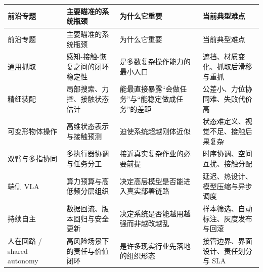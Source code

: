 \begingroup
\small
\begin{xltabular}{\textwidth}{YYYY}
\toprule
前沿专题 & 主要瞄准的系统瓶颈 & 为什么它重要 & 当前典型难点 \\
\midrule
\endfirsthead
\toprule
前沿专题 & 主要瞄准的系统瓶颈 & 为什么它重要 & 当前典型难点 \\
\midrule
\endhead
通用抓取 & 感知-接触-恢复之间的闭环稳定性 & 是多数复杂操作能力的最小入口 & 遮挡、材质变化、抓取后滑移与重抓 \\
精细装配 & 局部搜索、力控、接触状态估计 & 能最直接暴露“会做任务”与“能稳定做成任务”的差距 & 公差小、力位协同难、失败代价高 \\
可变形物体操作 & 高维状态表示与接触预测 & 迫使系统超越刚体近似 & 状态难定义、视觉不足、接触后果复杂 \\
双臂与多指协同 & 多执行器协调与任务分工 & 接近真实复杂作业的必要前提 & 时序协调、空间互扰、接触分配 \\
端侧 VLA & 算力预算与高低频分层组织 & 决定高层模型是否能进入真实部署链路 & 延迟、热设计、模型压缩与异步调度 \\
持续自主 & 数据回流、版本回归与安全更新 & 决定系统是否能越用越强而非越改越乱 & 样本筛选、自动标注、灰度发布与回滚 \\
人在回路 / shared autonomy & 高风险场景下的责任与价值闭环 & 是许多现实行业先落地的组织形态 & 接管边界、界面设计、责任划分与 SLA \\
\bottomrule
\end{xltabular}
\endgroup
